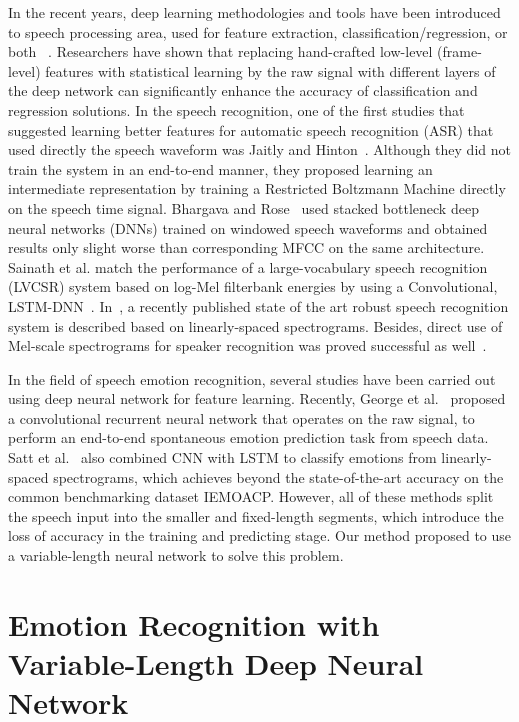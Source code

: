 \documentclass[a4paper]{article}
\begin{document}
In the recent years, deep learning methodologies and tools have been introduced to speech processing area, used for feature extraction, classification/regression, or both ~\cite{han2014, lee2015, huang2014, le2013, rana2016, chernykh2017}. Researchers have shown that replacing hand-crafted low-level (frame-level) features with statistical learning by the raw signal with different layers of the deep network can significantly enhance the accuracy of classification and regression solutions. In the speech recognition, one of the first studies that suggested learning better features for automatic speech recognition (ASR) that used directly the speech waveform was Jaitly and Hinton~\cite{jaitly2012}. Although they did not train the system in an end-to-end manner, they proposed learning an intermediate representation by training a Restricted Boltzmann Machine directly on the speech time signal. Bhargava and Rose~\cite{bhargava2015} used stacked bottleneck deep neural networks (DNNs) trained on windowed speech waveforms and obtained results only slight worse than corresponding MFCC on the same architecture. Sainath et al. match the performance of a large-vocabulary speech recognition (LVCSR) system based on log-Mel filterbank energies by using a Convolutional, LSTM-DNN~\cite{sainath2015a, sainath2015b}. In~\cite{hannun2014, amodei2015}, a recently published state of the art robust speech recognition system is described based on linearly-spaced spectrograms. Besides, direct use of Mel-scale spectrograms for speaker recognition was proved successful as well~\cite{variani2014}.

In the field of speech emotion recognition, several studies have been carried out using deep neural network for feature learning. Recently, George et al.~\cite{trigeorgis2016} proposed a convolutional recurrent neural network that operates on the raw signal, to perform an end-to-end spontaneous emotion prediction task from speech data. Satt et al.~\cite{satt2017} also combined CNN with LSTM to classify emotions from linearly-spaced spectrograms, which achieves beyond the state-of-the-art accuracy on the common benchmarking dataset IEMOACP. However, all of these methods split the speech input into the smaller and fixed-length segments, which introduce the loss of accuracy in the training and predicting stage. Our method proposed to use a variable-length neural network to solve this problem.

\section{Emotion Recognition with Variable-Length Deep Neural Network}
\label{sec:var_len_vs_fixed_len}
\end{document}
